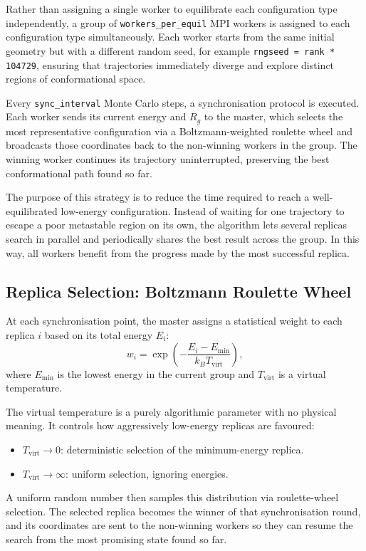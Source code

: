 Rather than assigning a single worker to equilibrate each configuration
type independently, a group of \texttt{workers\_per\_equil} MPI workers
is assigned to each configuration type simultaneously. Each worker
starts from the same initial geometry but with a different random seed,
for example \texttt{rngseed = rank * 104729}, ensuring that trajectories
immediately diverge and explore distinct regions of conformational
space.

Every \texttt{sync\_interval} Monte Carlo steps, a synchronisation
protocol is executed. Each worker sends its current energy and
\(R_g\) to the master, which selects the most representative
configuration via a Boltzmann-weighted roulette wheel and broadcasts
those coordinates back to the non-winning workers in the group. The
winning worker continues its trajectory uninterrupted, preserving the
best conformational path found so far.

The purpose of this strategy is to reduce the time required to reach a
well-equilibrated low-energy configuration. Instead of waiting for one
trajectory to escape a poor metastable region on its own, the algorithm
lets several replicas search in parallel and periodically shares the
best result across the group. In this way, all workers benefit from the
progress made by the most successful replica.

\subsection{Replica Selection: Boltzmann Roulette Wheel}

At each synchronisation point, the master assigns a statistical weight
to each replica \(i\) based on its total energy \(E_i\):
\[
w_i = \exp\!\left(-\frac{E_i - E_{\min}}{k_B T_{\mathrm{virt}}}\right),
\]
where \(E_{\min}\) is the lowest energy in the current group and
\(T_{\mathrm{virt}}\) is a virtual temperature.

The virtual temperature is a purely algorithmic parameter with no
physical meaning. It controls how aggressively low-energy replicas are
favoured:
\begin{itemize}
\item \(T_{\mathrm{virt}} \to 0\): deterministic selection of the
minimum-energy replica.
\item \(T_{\mathrm{virt}} \to \infty\): uniform selection, ignoring
energies.
\end{itemize}

A uniform random number then samples this distribution via roulette-wheel
selection. The selected replica becomes the winner of that
synchronisation round, and its coordinates are sent to the non-winning
workers so they can resume the search from the most promising state
found so far.

